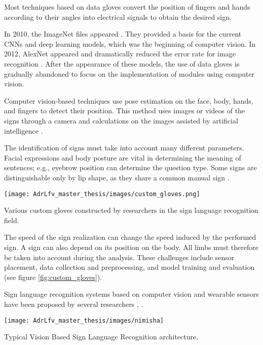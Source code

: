 Most techniques based on data gloves convert the position of fingers and hands according to their angles into electrical signals to obtain the desired sign. 

In 2010, the ImageNet files appeared \cite{li2010crowdsourcing}. They provided a basis for the current CNNs and deep learning models, which was the beginning of computer vision. In 2012, AlexNet appeared and dramatically reduced the error rate for image recognition \cite{alom2018history}. After the appearance of these models, the use of data gloves is gradually abandoned to focus on the implementation of modules using computer vision.

Computer vision-based techniques use pose estimation on the face, body, hands, and fingers to detect their position. This method uses images or videos of the signs through a camera and calculations on the images assisted by artificial intelligence \cite{adeyanju2021machine}. 

The identification of signs must take into account many different parameters. Facial expressions and body posture are vital in determining the meaning of sentences; e.g., eyebrow position can determine the question type. Some signs are distinguishable only by lip shape, as they share a common manual sign \cite{cooper2011sign}. 


\begin{marginfigure}
    \centering
    
    \texttt{[image: AdrLfv\_master\_thesis/images/custom\_gloves.png]}
    \caption{Various custom gloves constructed by researchers in the sign language recognition field.}
    \label{fig:custom_gloves}
\end{marginfigure}

The speed of the sign realization can change the speed induced by the performed sign. A sign can also depend on its position on the body. All limbs must therefore be taken into account during the analysis. These challenges include sensor placement, data collection and preprocessing, and model training and evaluation \cite{9178440} (see figure \ref{fig:custom_gloves}).

Sign language recognition systems based on computer vision and wearable sensors have been proposed by several researchers \cite{ionescu2005dynamic} \cite{yu2010vision} \cite{li2015feature} \cite{sonkusare2015review} \cite{bobic2016hand} \cite{islam2017real} \cite{islam2017real} \cite{saha2018machine}, \cite{rastgoo2021hand} \cite{xu2021application}. 

\begin{marginfigure}
    \centering
    \texttt{[image: AdrLfv\_master\_thesis/images/nimisha]}
    \caption{Typical Vision Based Sign Language Recognition architecture.}
    \label{fig:nimisha}
\end{marginfigure}

